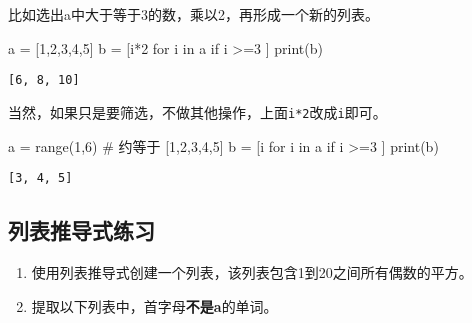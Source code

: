 \documentclass[
  letterpaper,
  DIV=11,
  numbers=noendperiod]{scrreprt}
\newenvironment{Shaded}{\begin{snugshade}}{\end{snugshade}}
\newcommand{\BuiltInTok}[1]{\textcolor[rgb]{0.00,0.23,0.31}{#1}}
\newcommand{\CommentTok}[1]{\textcolor[rgb]{0.37,0.37,0.37}{#1}}
\newcommand{\ControlFlowTok}[1]{\textcolor[rgb]{0.00,0.23,0.31}{#1}}
\newcommand{\DecValTok}[1]{\textcolor[rgb]{0.68,0.00,0.00}{#1}}
\newcommand{\KeywordTok}[1]{\textcolor[rgb]{0.00,0.23,0.31}{#1}}
\newcommand{\NormalTok}[1]{\textcolor[rgb]{0.00,0.23,0.31}{#1}}
\newcommand{\OperatorTok}[1]{\textcolor[rgb]{0.37,0.37,0.37}{#1}}
\providecommand{\tightlist}{%
  \setlength{\itemsep}{0pt}\setlength{\parskip}{0pt}}\usepackage{longtable,booktabs,array}
\begin{document}
比如选出a中大于等于3的数，乘以2，再形成一个新的列表。

\begin{Shaded}
\begin{Highlighting}[]
\NormalTok{a }\OperatorTok{=}\NormalTok{ [}\DecValTok{1}\NormalTok{,}\DecValTok{2}\NormalTok{,}\DecValTok{3}\NormalTok{,}\DecValTok{4}\NormalTok{,}\DecValTok{5}\NormalTok{]}
\NormalTok{b }\OperatorTok{=}\NormalTok{ [i}\OperatorTok{*}\DecValTok{2} \ControlFlowTok{for}\NormalTok{ i }\KeywordTok{in}\NormalTok{ a }\ControlFlowTok{if}\NormalTok{ i }\OperatorTok{\textgreater{}=}\DecValTok{3}\NormalTok{ ]}
\BuiltInTok{print}\NormalTok{(b)}
\end{Highlighting}
\end{Shaded}

\begin{verbatim}
[6, 8, 10]
\end{verbatim}

当然，如果只是要筛选，不做其他操作，上面\texttt{i*2}改成\texttt{i}即可。

\begin{Shaded}
\begin{Highlighting}[]
\NormalTok{a }\OperatorTok{=} \BuiltInTok{range}\NormalTok{(}\DecValTok{1}\NormalTok{,}\DecValTok{6}\NormalTok{) }\CommentTok{\# 约等于 [1,2,3,4,5]}
\NormalTok{b }\OperatorTok{=}\NormalTok{ [i }\ControlFlowTok{for}\NormalTok{ i }\KeywordTok{in}\NormalTok{ a }\ControlFlowTok{if}\NormalTok{ i }\OperatorTok{\textgreater{}=}\DecValTok{3}\NormalTok{ ]}
\BuiltInTok{print}\NormalTok{(b)}
\end{Highlighting}
\end{Shaded}

\begin{verbatim}
[3, 4, 5]
\end{verbatim}

\hypertarget{ux5217ux8868ux63a8ux5bfcux5f0fux7ec3ux4e60}{%
\subsection{列表推导式练习}\label{ux5217ux8868ux63a8ux5bfcux5f0fux7ec3ux4e60}}

\begin{enumerate}
\def\labelenumi{\arabic{enumi}.}
\tightlist
\item
  使用列表推导式创建一个列表，该列表包含1到20之间所有偶数的平方。
\item
  提取以下列表中，首字母\textbf{不是a}的单词。
\end{enumerate}
\end{document}

